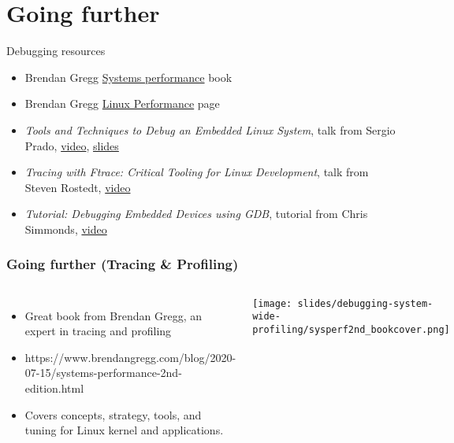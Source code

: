 \section{Going further}

\begin{frame}{Debugging resources}
  \begin{itemize}
  \item Brendan Gregg
    \href{https://www.brendangregg.com/systems-performance-2nd-edition-book.html}{Systems
      performance} book
  \item Brendan Gregg
    \href{https://www.brendangregg.com/linuxperf.html}{Linux
      Performance} page
  \item {\em Tools and Techniques to Debug an Embedded Linux System},
    talk from Sergio Prado,
    \href{https://www.youtube.com/watch?v=dgPkZnGuIMg}{video},
    \href{https://elinux.org/images/c/cf/Slides-debugging.pdf}{slides}
  \item {\em Tracing with Ftrace: Critical Tooling for Linux
      Development}, talk from Steven Rostedt,
    \href{https://www.youtube.com/watch?v=mlxqpNvfvEQ}{video}
  \item {\em Tutorial: Debugging Embedded Devices using GDB}, tutorial
    from Chris Simmonds,
    \href{https://www.youtube.com/watch?v=JGhAgd2a_Ck}{video}
  \end{itemize}
\end{frame}

\begin{frame}[fragile]
  \frametitle{Going further (Tracing \& Profiling)}
  \begin{columns}[T]
    \begin{itemize}
    \item Great book from Brendan Gregg, an expert in tracing and profiling
    \item https://www.brendangregg.com/blog/2020-07-15/systems-performance-2nd-edition.html
    \item Covers concepts, strategy, tools, and tuning for Linux kernel
      and applications.
    \end{itemize}
    \texttt{[image: slides/debugging-system-wide-profiling/sysperf2nd\_bookcover.png]}\\ 
  \end{columns}
\end{frame}

